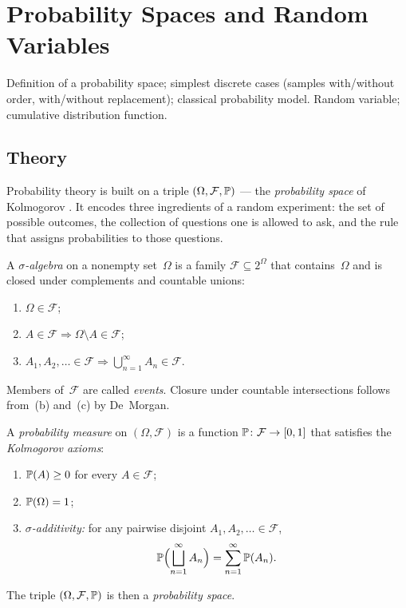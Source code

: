 
\section{Probability Spaces and Random Variables}
\label{sec:1.2.01-prob-space-rv}

\begin{ticket}
Definition of a probability space; simplest discrete cases (samples with/without order, with/without replacement); classical probability model. Random variable; cumulative distribution function.
\end{ticket}

\subsection*{Theory}

Probability theory is built on a triple $(\Omega, \mathcal{F}, \mathbb{P})$ —
the \emph{probability space} of Kolmogorov \cite{Shiryaev1989}. It
encodes three ingredients of a random experiment: the set of possible
outcomes, the collection of questions one is allowed to ask, and the
rule that assigns probabilities to those questions.

\begin{definition}
\label{def:sigma-algebra}
A \emph{$\sigma$-algebra} on a nonempty set~$\Omega$ is a family
$\mathcal{F} \subseteq 2^{\Omega}$ that contains~$\Omega$ and is closed
under complements and countable unions:
\begin{enumerate}[label=(\alph*)]
  \item $\Omega \in \mathcal{F}$;
  \item $A \in \mathcal{F} \Rightarrow \Omega \setminus A \in \mathcal{F}$;
  \item $A_1, A_2, \dots \in \mathcal{F} \Rightarrow \bigcup_{n=1}^{\infty} A_n \in \mathcal{F}$.
\end{enumerate}
Members of~$\mathcal{F}$ are called \emph{events}. Closure under
countable intersections follows from~(b) and~(c) by De~Morgan.
\end{definition}

\begin{definition}
\label{def:prob-measure}
A \emph{probability measure} on $(\Omega, \mathcal{F})$ is a function
$\mathbb{P} \colon \mathcal{F} \to [0, 1]$ that satisfies the
\emph{Kolmogorov axioms}:
\begin{enumerate}[label=(P\arabic*)]
  \item $\mathbb{P}(A) \geq 0$ for every $A \in \mathcal{F}$;
  \item $\mathbb{P}(\Omega) = 1$;
  \item \emph{$\sigma$-additivity:} for any pairwise disjoint
        $A_1, A_2, \dots \in \mathcal{F}$,
        \[
          \mathbb{P}\Bigl(\bigsqcup_{n=1}^{\infty} A_n\Bigr) = \sum_{n=1}^{\infty} \mathbb{P}(A_n).
        \]
\end{enumerate}
The triple $(\Omega, \mathcal{F}, \mathbb{P})$ is then a
\emph{probability space}.
\end{definition}

